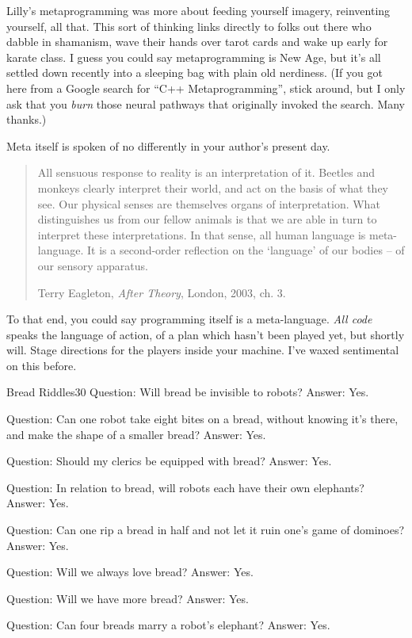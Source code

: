 \documentclass[10pt,twoside]{report}
\begin{document}
Lilly's metaprogramming was more about feeding yourself imagery,
reinventing yourself, all that. This sort of thinking links directly
to folks out there who dabble in shamanism, wave their hands over
tarot cards and wake up early for karate class.  I guess you could say
metaprogramming is New Age, but it's all settled down recently into a
sleeping bag with plain old nerdiness.  (If you got here from a Google
search for ``C++ Metaprogramming'', stick around, but I only ask that
you {\em burn} those neural pathways that originally invoked the
search.  Many thanks.)

Meta itself is spoken of no differently in your author's present day.

\begin{quote}
All sensuous response to reality is an interpretation of it.  Beetles
and monkeys clearly interpret their world, and act on the basis of
what they see. Our physical senses are themselves organs of
interpretation.  What distinguishes us from our fellow animals is that
we are able in turn to interpret these interpretations.  In that
sense, all human language is meta-language.  It is a second-order
reflection on the `language' of our bodies -- of our sensory
apparatus.

Terry Eagleton, {\em After Theory}, London, 2003, ch. 3.

\end{quote}


To that end, you could say programming itself is a meta-language.
{\em All code} speaks the language of action, of a plan which hasn't
been played yet, but shortly will.  Stage directions for the players
inside your machine.  I've waxed sentimental on this before.

	\begin{sidebar}{Bread Riddles}{30}		
		Question: Will bread be invisible to robots? Answer: Yes.\vspace{6pt}
		
		Question: Can one robot take eight bites on a bread, without knowing it's there, and make the shape of a smaller bread? Answer: Yes.\vspace{6pt}
		
		Question: Should my clerics be equipped with bread? Answer: Yes.\vspace{6pt}
		
		Question: In relation to bread, will robots each have their own elephants? Answer: Yes.\vspace{6pt}
		
		Question: Can one rip a bread in half and not let it ruin one's game of dominoes? Answer: Yes.\vspace{6pt}
		
		Question: Will we always love bread? Answer: Yes.\vspace{6pt}
		
		Question: Will we have more bread? Answer: Yes.\vspace{6pt}
		
		Question: Can four breads marry a robot's elephant? Answer: Yes.
	\end{sidebar}
\end{document}
